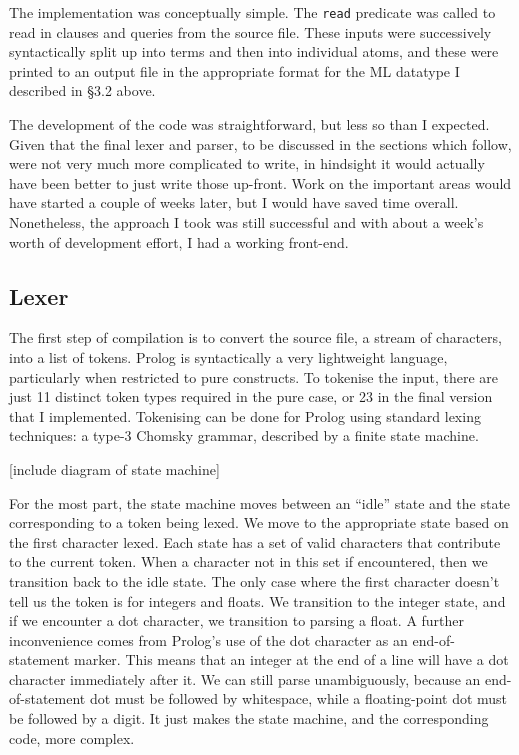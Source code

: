 \documentclass[12pt]{article}
\begin{document}
The implementation was conceptually simple. 
The \verb|read| predicate was called to read in clauses and queries from the source file. 
These inputs were successively syntactically split up into terms and then into individual atoms, and these were printed to an output file in the appropriate format for the ML datatype I described in \S3.2 above.

The development of the code was straightforward, but less so than I expected. 
Given that the final lexer and parser, to be discussed in the sections which follow, were not very much more complicated to write, in hindsight it would actually have been better to just write those up-front. 
Work on the important areas would have started a couple of weeks later, but I would have saved time overall.
Nonetheless, the approach I took was still successful and with about a week's worth of development effort, I had a working front-end.

\subsection{Lexer}

The first step of compilation is to convert the source file, a stream of characters, into a list of tokens. 
Prolog is syntactically a very lightweight language, particularly when restricted to pure constructs. 
To tokenise the input, there are just 11 distinct token types required in the pure case, or 23 in the final version that I implemented. 
Tokenising can be done for Prolog using standard lexing techniques: a type-3 Chomsky grammar, described by a finite state machine. 


[include diagram of state machine]

For the most part, the state machine moves between an ``idle'' state and the state corresponding to a token being lexed. 
We move to the appropriate state based on the first character lexed. 
Each state has a set of valid characters that contribute to the current token. 
When a character not in this set if encountered, then we transition back to the idle state.
The only case where the first character doesn't tell us the token is for integers and floats. 
We transition to the integer state, and if we encounter a dot character, we transition to parsing a float.
A further inconvenience comes from Prolog's use of the dot character as an end-of-statement marker. 
This means that an integer at the end of a line will have a dot character immediately after it. 
We can still parse unambiguously, because an end-of-statement dot must be followed by whitespace, while a floating-point dot must be followed by a digit. 
It just makes the state machine, and the corresponding code, more complex.
\end{document}
